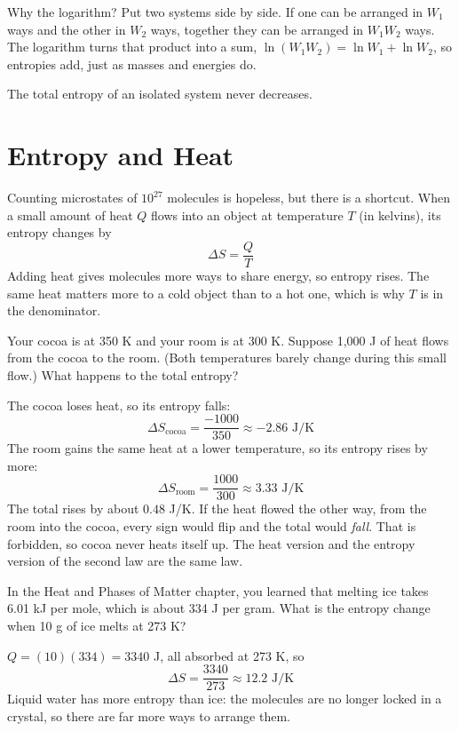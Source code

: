 Why the logarithm? Put two systems side by side. If one can be arranged in $W_1$ ways and the other in
$W_2$ ways, together they can be arranged in $W_1 W_2$ ways. The logarithm turns that product into a
sum, $\ln(W_1W_2) = \ln W_1 + \ln W_2$, so entropies add, just as masses and energies do.

\begin{mdframed}[style = important, frametitle = {The Second Law (Entropy Version)}]
The total entropy of an isolated system never decreases.
\end{mdframed}

\section{Entropy and Heat}
Counting microstates of $10^{27}$ molecules is hopeless, but there is a shortcut. When a small amount
of heat $Q$ flows into an object at temperature $T$ (in kelvins), its entropy changes by
$$\Delta S = \frac{Q}{T}$$
Adding heat gives molecules more ways to share energy, so entropy rises. The same heat matters more
to a cold object than to a hot one, which is why $T$ is in the denominator.

\begin{Worked}
\begin{Problem}
Your cocoa is at 350 K and your room is at 300 K. Suppose 1,000 J of heat flows from
the cocoa to the room. (Both temperatures barely change during this small flow.) What happens to the
total entropy?
\end{Problem}
\begin{Solution}
The cocoa loses heat, so its entropy falls:
$$\Delta S_{\text{cocoa}} = \frac{-1000}{350} \approx -2.86 \text{ J/K}$$
The room gains the same heat at a lower temperature, so its entropy rises by more:
$$\Delta S_{\text{room}} = \frac{1000}{300} \approx 3.33 \text{ J/K}$$
The total rises by about $0.48$ J/K. If the heat flowed the other way, from the room into the cocoa,
every sign would flip and the total would \emph{fall}. That is forbidden, so cocoa never heats itself
up. The heat version and the entropy version of the second law are the same law.
\end{Solution}
\end{Worked}

\begin{Worked}
\begin{Problem}
In the Heat and Phases of Matter chapter, you learned that melting ice takes 6.01 kJ per
mole, which is about 334 J per gram. What is the entropy change when 10 g of ice melts at 273 K?
\end{Problem}
\begin{Solution}
$Q = (10)(334) = 3340$ J, all absorbed at 273 K, so
$$\Delta S = \frac{3340}{273} \approx 12.2 \text{ J/K}$$
Liquid water has more entropy than ice: the molecules are no longer locked in a crystal, so there are
far more ways to arrange them.
\end{Solution}
\end{Worked}

